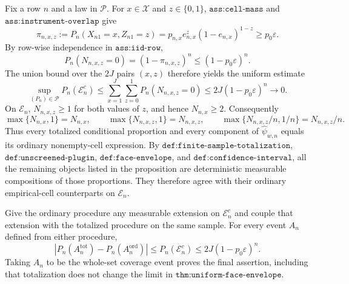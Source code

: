 Fix a row \(n\) and a law in \(\mathcal P\). For \(x\in\mathcal X\) and \(z\in\{0,1\}\), \(\texttt{ass:cell-mass}\) and \(\texttt{ass:instrument-overlap}\) give
\[
 \pi_{n,x,z}:=P_n(X_{n1}=x,Z_{n1}=z)
 =p_{n,x}e_{n,x}^{z}(1-e_{n,x})^{1-z}
 \ge p_0\varepsilon .
\]
By row-wise independence in \(\texttt{ass:iid-row}\),
\[
 P_n(N_{n,x,z}=0)=(1-\pi_{n,x,z})^n
 \le (1-p_0\varepsilon)^n .
\]
The union bound over the \(2J\) pairs \((x,z)\) therefore yields the uniform estimate
\[
 \sup_{(P_n)\in\mathcal P}P_n(\mathcal E_n^c)
 \le \sum_{x=1}^{J}\sum_{z=0}^{1}P_n(N_{n,x,z}=0)
 \le 2J(1-p_0\varepsilon)^n\longrightarrow0.
\]
On \(\mathcal E_n\), \(N_{n,x,z}\ge1\) for both values of \(z\), and hence \(N_{n,x}\ge2\). Consequently
\[
 \max\{N_{n,x},1\}=N_{n,x},\qquad
 \max\{N_{n,x,z},1\}=N_{n,x,z},\qquad
 \max\{N_{n,x,z}/n,1/n\}=N_{n,x,z}/n.
\]
Thus every totalized conditional proportion and every component of \(\widehat\psi_{w,n}\) equals its ordinary nonempty-cell expression. By \(\texttt{def:finite-sample-totalization}\), \(\texttt{def:unscreened-plugin}\), \(\texttt{def:face-envelope}\), and \(\texttt{def:confidence-interval}\), all the remaining objects listed in the proposition are deterministic measurable compositions of those proportions. They therefore agree with their ordinary empirical-cell counterparts on \(\mathcal E_n\).

Give the ordinary procedure any measurable extension on \(\mathcal E_n^c\) and couple that extension with the totalized procedure on the same sample. For every event \(A_n\) defined from either procedure,
\[
 \left|P_n(A_n^{\mathrm{tot}})-P_n(A_n^{\mathrm{ord}})\right|
 \le P_n(\mathcal E_n^c)
 \le2J(1-p_0\varepsilon)^n.
\]
Taking \(A_n\) to be the whole-set coverage event proves the final assertion, including that totalization does not change the limit in \(\texttt{thm:uniform-face-envelope}\).

